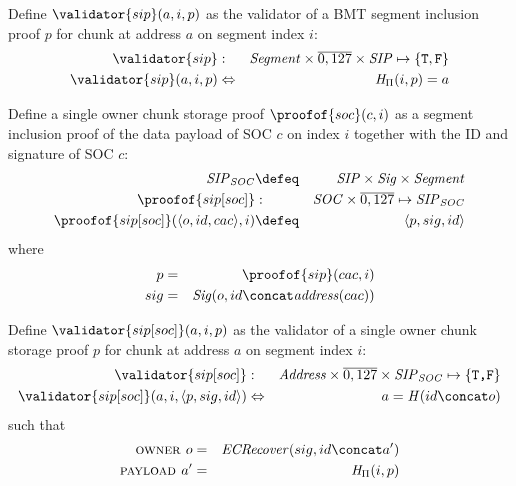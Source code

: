 \begin{definition}
\label{def:sip-validation}
Define  $\validator{sip}(a, i, p)$ as the validator of a BMT segment inclusion proof $p$ for chunk at address $a$ on segment index $i$:
%
\begin{eqnarray}
\validator{sip}&:&\mathit{Segment}\times\overline{0,127}\times \mathit{SIP} \mapsto \{\mathtt{T,F}\}
\\
\validator{sip}(a,i,p) &\Leftrightarrow&
\mathit{H}_{\Pi}(i,p)=a
\end{eqnarray}
\end{definition}

\begin{definition}
\label{def:socproof}
Define a single owner chunk storage proof $\proofof{soc}(c,i)$ as a segment inclusion proof of the data payload of SOC $c$ on index $i$ together with the ID and signature of SOC $c$:
%
\begin{eqnarray}
\mathit{SIP}_\mathit{SOC} &\defeq&\mathit{SIP}\times\mathit{Sig}\times\mathit{Segment}\\
\proofof{sip[soc]} &:&\mathit{SOC}\times\overline{0,127}\mapsto\mathit{SIP}_\mathit{SOC}\\ 
\proofof{sip[soc]}(\langle o,id,cac\rangle,i)&\defeq&  \langle p, sig, id\rangle
\end{eqnarray}
%
where
%
\begin{eqnarray}
p&=&\proofof{sip}(cac,i)\\
sig&=&\mathit{Sig}(o,id\concat \mathit{address}(cac))
\end{eqnarray}
\end{definition}

\begin{definition}
\label{def:socproof-validity}
Define $\validator{sip[soc]}(a, i, p)$ as the validator of a single owner chunk storage proof $p$ for chunk at address $a$ on segment index $i$:
%
\begin{eqnarray}
\validator{sip[soc]}&:&\mathit{Address}\times\overline{0,127}\times\mathit{SIP}_\mathit{SOC}\mapsto\{\texttt{T,F}\}\\ \validator{sip[soc]}(a, i, \langle p, sig, id\rangle)&
\Leftrightarrow&a= \mathit{H}(id\concat o)
\end{eqnarray}
such that 
\begin{eqnarray}
\textsc{owner } o&=& \mathit{ECRecover}(sig,id\concat a')\\
\textsc{payload } a'&=& \mathit{H}_{\Pi}(i,p)
\end{eqnarray}
\end{definition}



